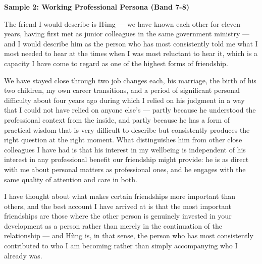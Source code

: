 \begin{ieltsanswer}
\textbf{Sample 2: Working Professional Persona (Band 7-8)}

The friend I would describe is Hùng — we have known each other for eleven years, having first met as junior colleagues in the same government ministry — and I would describe him as the person who has most consistently told me what I most needed to hear at the times when I was most reluctant to hear it, which is a capacity I have come to regard as one of the highest forms of friendship.

We have stayed close through two job changes each, his marriage, the birth of his two children, my own career transitions, and a period of significant personal difficulty about four years ago during which I relied on his judgment in a way that I could not have relied on anyone else's — partly because he understood the professional context from the inside, and partly because he has a form of practical wisdom that is very difficult to describe but consistently produces the right question at the right moment. What distinguishes him from other close colleagues I have had is that his interest in my wellbeing is independent of his interest in any professional benefit our friendship might provide: he is as direct with me about personal matters as professional ones, and he engages with the same quality of attention and care in both.

I have thought about what makes certain friendships more important than others, and the best account I have arrived at is that the most important friendships are those where the other person is genuinely invested in your development as a person rather than merely in the continuation of the relationship — and Hùng is, in that sense, the person who has most consistently contributed to who I am becoming rather than simply accompanying who I already was.
\end{ieltsanswer}



